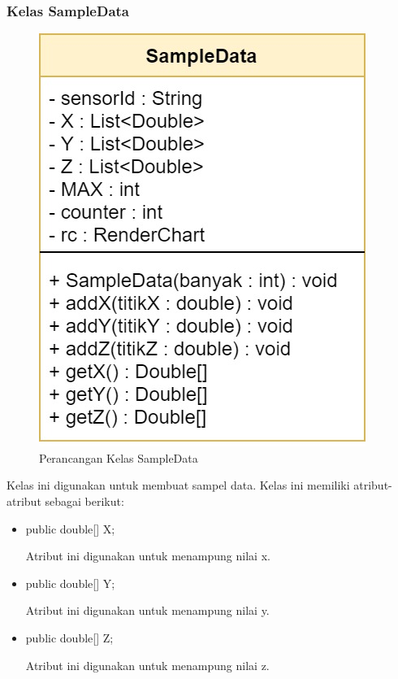 \subsubsection{Kelas SampleData}
\begin{figure}[H] 
	\centering  
	\includegraphics[scale=0.35]{Gambar/Controller Package/Controller-sampleData.jpg}
	\caption[Perancangan Kelas SampleData]{Perancangan Kelas SampleData}
	\label{fig:controller_sampleData} 
\end{figure}
Kelas ini digunakan untuk membuat sampel data. Kelas ini memiliki atribut-atribut sebagai berikut:
\begin{itemize}
    \item public double[] X;
    
    Atribut ini digunakan untuk menampung nilai x.
    
    \item public double[] Y;
    
    Atribut ini digunakan untuk menampung nilai y.
    
    \item public double[] Z;
    
    Atribut ini digunakan untuk menampung nilai z.
\end{itemize}

